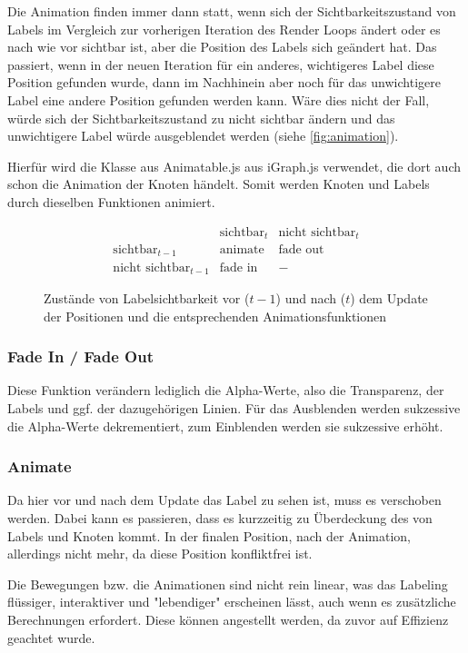 Die Animation finden immer dann statt, wenn sich der Sichtbarkeitszustand von Labels im Vergleich zur vorherigen Iteration des Render Loops ändert
oder es nach wie vor sichtbar ist, aber die Position des Labels sich geändert hat.
Das passiert, wenn in der neuen Iteration für ein anderes, wichtigeres Label diese Position gefunden wurde, dann im Nachhinein aber noch für das unwichtigere Label eine andere Position gefunden werden kann.
Wäre dies nicht der Fall, würde sich der Sichtbarkeitszustand zu nicht sichtbar ändern und das unwichtigere Label würde ausgeblendet werden (siehe \autoref{fig:animation}).

Hierfür wird die Klasse aus {Animatable.js} aus {iGraph.js} verwendet, die dort auch schon die Animation der Knoten händelt.
Somit werden Knoten und Labels durch dieselben Funktionen animiert.

\begin{figure}[H]
    \centering

   $$ \begin{array}{c|c|c}
                        & \text{sichtbar}_t  & \text{nicht sichtbar}_t\\ \hline
         \text{sichtbar}_{t-1}   & \text{animate}   & \text{fade out} \\ \hline
        \text{nicht sichtbar}_{t-1} & \text{fade in}    & -
    \end{array}$$
    \caption{Zustände von Labelsichtbarkeit vor ($t-1$) und nach ($t$) dem Update der Positionen und die entsprechenden Animationsfunktionen}
    \label{fig:animation}
\end{figure}

\subsubsection{Fade In / Fade Out}
Diese Funktion verändern lediglich die Alpha-Werte, also die Transparenz, der Labels und ggf. der dazugehörigen Linien.
Für das Ausblenden werden sukzessive die Alpha-Werte dekrementiert, zum Einblenden werden sie sukzessive erhöht.

\subsubsection{Animate}
Da hier vor und nach dem Update das Label zu sehen ist, muss es verschoben werden.
Dabei kann es passieren, dass es kurzzeitig zu Überdeckung des von Labels und Knoten kommt.
In der finalen Position, nach der Animation, allerdings nicht mehr, da diese Position konfliktfrei ist.

Die Bewegungen bzw. die Animationen sind nicht rein linear, was das Labeling flüssiger, interaktiver und "lebendiger" erscheinen lässt, auch wenn es zusätzliche Berechnungen erfordert.
Diese können angestellt werden, da zuvor auf Effizienz geachtet wurde.
